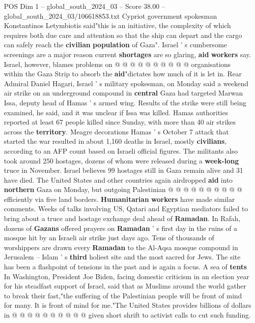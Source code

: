 \begin{textsample}{POS Dim 1 – global\_south\_2024\_03 – Score 38.00 – global\_south\_2024\_03/106618853.txt}
Cypriot government spokesman Konstantinos Letymbiotis said"this is an initiative, the complexity of which requires both due care and attention so that the ship can depart and the cargo can safely reach the \textbf{civilian} \textbf{population} of Gaza".
Israel ' s cumbersome screenings are a major reason current \textbf{shortages} are so glaring, \textbf{aid} \textbf{workers} say.
Israel, however, blames problems on @ @ @ @ @ @ @ @ @ @ organisations within the Gaza Strip to absorb the \textbf{aid}"dictates how much of it is let in.
Rear Admiral Daniel Hagari, Israel ' s military spokesman, on Monday said a weekend air strike on an underground compound in \textbf{central} Gaza had targeted Marwan Issa, deputy head of Hamas ' s armed wing.
Results of the strike were still being examined, he said, and it was unclear if Issa was killed.
Hamas authorities reported at least 67 people killed since Sunday, with more than 40 air strikes across the \textbf{territory}.
Meagre decorations Hamas ' s October 7 attack that started the war resulted in about 1,160 deaths in Israel, mostly \textbf{civilians}, according to an AFP count based on Israeli official figures.
The militants also took around 250 hostages, dozens of whom were released during a \textbf{week-long} truce in November.
Israel believes 99 hostages still in Gaza remain alive and 31 have died.
The United States and other countries again airdropped \textbf{aid} into \textbf{northern} Gaza on Monday, but outgoing Palestinian @ @ @ @ @ @ @ @ @ @ efficiently via five land borders. \textbf{Humanitarian} \textbf{workers} have made similar comments.
Weeks of talks involving US, Qatari and Egyptian mediators failed to bring about a truce and hostage exchange deal ahead of \textbf{Ramadan}.
In Rafah, dozens of \textbf{Gazans} offered prayers on \textbf{Ramadan} ' s first day in the ruins of a mosque hit by an Israeli air strike just days ago.
Tens of thousands of worshippers are drawn every \textbf{Ramadan} to the Al-Aqsa mosque compound in Jerusalem -- Islam ' s \textbf{third} holiest site and the most sacred for Jews.
The site has been a flashpoint of tensions in the past and is again a focus.
A sea of \textbf{tents} In Washington, President Joe Biden, facing domestic criticism in an election year for his steadfast support of Israel, said that as Muslims around the world gather to break their fast,"the suffering of the Palestinian people will be front of mind for many.
It is front of mind for me."The United States provides billions of dollars in @ @ @ @ @ @ @ @ @ @ given short shrift to activist calls to cut such funding.

\end{textsample}

